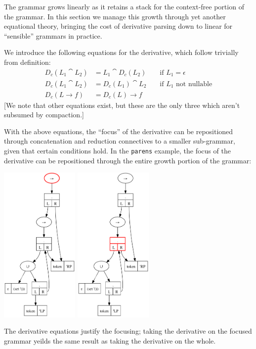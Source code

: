 The grammar grows linearly as it retains a stack for the context-free portion
of the grammar.
%
In this section we manage this growth through yet another equational theory,
bringing the cost of derivative parsing down to linear for ``sensible''
grammars in practice.

We introduce the following equations for the derivative, which follow trivially
from definition:
%
\begin{align*}
  D_c(L_1 \cat L_2) &= L_1 \cat D_c(L_2) & &\text{ if } L_1 = \epsilon
  \\
  D_c(L_1 \cat L_2) &= D_c(L_1) \cat L_2 & &\text{ if } L_1 \text{ not nullable}
  \\
  D_c(L \to f) &= D_c(L) \to f
\end{align*}
%
[We note that other equations exist, but these are the only three which aren't
subsumed by compaction.]

With the above equations, the ``focus'' of the derivative can be repositioned
through concatenation and reduction connectives to a smaller sub-grammar, given
that certain conditions hold.
%
In the {\tt parens} example, the focus of the derivative can be repositioned through
the entire growth portion of the grammar:
%
\begin{center}
 \includegraphics[width=1.5in]{parens-step-2-c.png}
 \includegraphics[width=1.5in]{parens-step-2-f.png}
\end{center}
%
The derivative equations justify the focusing; taking the derivative on the
focused grammar yeilds the same result as taking the derivative on the whole.

